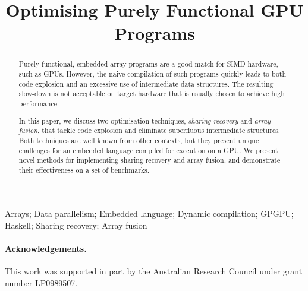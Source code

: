\documentclass{sigplanconf}
\begin{document}

\exclusivelicense
{}

\title{Optimising Purely Functional GPU Programs}
\maketitle

\makeatactive

\begin{abstract}
Purely functional, embedded array programs are a good match for SIMD hardware, such as GPUs. However, the naive compilation of such programs quickly leads to both code explosion and an excessive use of intermediate data structures. The resulting slow-down is not acceptable on target hardware that is usually chosen to achieve high performance.
  
In this paper, we discuss two optimisation techniques, \emph{sharing recovery} and \emph{array fusion}, that tackle code explosion and eliminate superfluous intermediate structures. Both techniques are well known from other contexts, but they present unique challenges for an embedded language compiled for execution on a GPU. We present novel methods for implementing sharing recovery and array fusion, and demonstrate their effectiveness on a set of benchmarks.
\end{abstract}



\keywords Arrays; Data parallelism; Embedded language; Dynamic compilation; GPGPU; Haskell; Sharing recovery; Array fusion










\paragraph{Acknowledgements.}
This work was supported in part by the Australian Research Council under grant number LP0989507.



\end{document}
